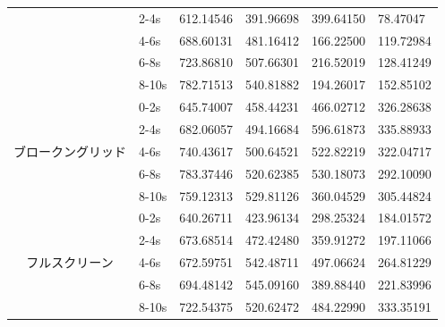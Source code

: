 \begin{table}[h]
\begin{tabular}{clllll}
    & 2-4s & 612.14546 & 391.96698 & 399.64150 & 78.47047 \\
    & 4-6s & 688.60131 & 481.16412 & 166.22500 & 119.72984 \\
    & 6-8s & 723.86810 & 507.66301 & 216.52019 & 128.41249 \\
    & 8-10s & 782.71513 & 540.81882 & 194.26017 & 152.85102 \\
    \hline
    \multirow{5}{*}{ブロークングリッド} & 0-2s & 645.74007 & 458.44231 & 466.02712 & 326.28638 \\
    & 2-4s & 682.06057 & 494.16684 & 596.61873 & 335.88933 \\
    & 4-6s & 740.43617 & 500.64521 & 522.82219 & 322.04717 \\
    & 6-8s & 783.37446 & 520.62385 & 530.18073 & 292.10090 \\
    & 8-10s & 759.12313 & 529.81126 & 360.04529 & 305.44824 \\
    \hline
    \multirow{5}{*}{フルスクリーン} & 0-2s & 640.26711 & 423.96134 & 298.25324 & 184.01572 \\
    & 2-4s & 673.68514 & 472.42480 & 359.91272 & 197.11066 \\
    & 4-6s & 672.59751 & 542.48711 & 497.06624 & 264.81229 \\
    & 6-8s & 694.48142 & 545.09160 & 389.88440 & 221.83996 \\
    & 8-10s & 722.54375 & 520.62472 & 484.22990 & 333.35191 \\
    \hline
  \end{tabular}
\end{table}

